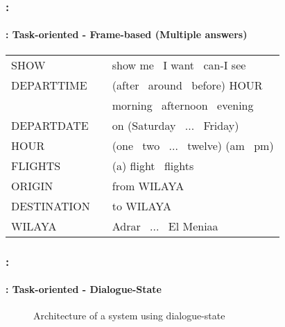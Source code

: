 \documentclass[xcolor=table]{beamer}
\begin{document}
\begin{frame}
	\frametitle{\insertshortsubtitle: \insertsection}
	\framesubtitle{\insertsubsection: Task-oriented - Frame-based (Multiple answers)}
	
		\centering\footnotesize
		\begin{tabular}{lll}
			SHOW & \textrightarrow & show me \textbar\ I want \textbar\ can-I see \\
			DEPARTTIME & \textrightarrow & (after \textbar\ around \textbar\ before) HOUR \textbar\\
			&  & morning \textbar\ afternoon \textbar\ evening\\
			DEPARTDATE & \textrightarrow & on (Saturday \textbar\ ... \textbar\ Friday)\\
			HOUR & \textrightarrow & (one \textbar\ two \textbar\ ... \textbar\ twelve) (am \textbar\ pm) \\
			FLIGHTS & \textrightarrow & (a) flight \textbar\ flights \\
			ORIGIN & \textrightarrow & from WILAYA \\
			DESTINATION & \textrightarrow & to WILAYA \\
			WILAYA & \textrightarrow & Adrar \textbar\ ... \textbar\ El Meniaa \\
		\end{tabular}
		
	
\end{frame}

\begin{frame}
	\frametitle{\insertshortsubtitle: \insertsection}
	\framesubtitle{\insertsubsection: Task-oriented - Dialogue-State}
	
	\begin{figure}
		\centering
		\caption{Architecture of a system using dialogue-state \cite{2016-williams-al}}
	\end{figure}
	
\end{frame}
\end{document}
